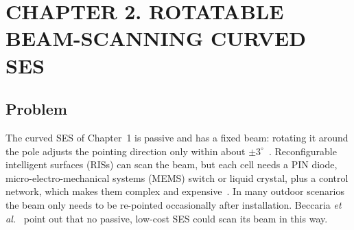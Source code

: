 \section*{CHAPTER 2. ROTATABLE BEAM-SCANNING CURVED SES}
\setcounter{section}{2}
\setcounter{subsection}{0}
\setcounter{equation}{0}
\setcounter{theorem}{0}
\setcounter{figure}{0}
\setcounter{table}{0}

\subsection{Problem}
The curved SES of Chapter~1 is passive and has a fixed beam: rotating it around the pole adjusts the pointing direction only within about $\pm 3^\circ$~\cite{Beccaria2025B}. Reconfigurable intelligent surfaces (RISs) can scan the beam, but each cell needs a PIN diode, micro-electro-mechanical systems (MEMS) switch or liquid crystal, plus a control network, which makes them complex and expensive~\cite{Beccaria2025B}. In many outdoor scenarios the beam only needs to be re-pointed occasionally after installation. Beccaria \textit{et al.}~\cite{Beccaria2025B} point out that no passive, low-cost SES could scan its beam in this way.

